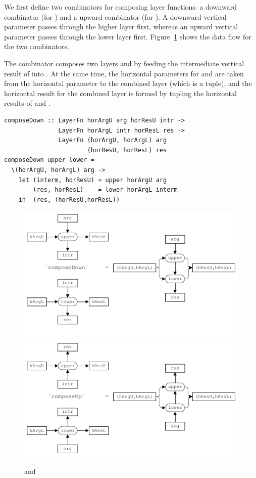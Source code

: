 \documentclass[preprint,natbib]{sigplanconf}
\begin{document}
We first define two combinators for composing layer functions: a downward combinator  (for ) and a upward combinator  (for ). A downward vertical parameter passes through the higher layer first, whereas an upward vertical parameter passes through the lower layer first. Figure~\ref{composeDownUp} shows the data flow for the two combinators. 

The combinator  composes two layers  and  by feeding the intermediate vertical result of  into . At the same time, the horizontal parameters for  and  are taken from the horizontal parameter to the combined layer (which is a tuple), and the horizontal result for the combined layer is formed by tupling the horizontal results of  and . 

\begin{small}
\begin{verbatim}
composeDown :: LayerFn horArgU arg horResU intr ->
               LayerFn horArgL intr horResL res ->
               LayerFn (horArgU, horArgL) arg 
                       (horResU, horResL) res
composeDown upper lower = 
  \(horArgU, horArgL) arg ->                                           
    let (interm, horResU) = upper horArgU arg
        (res, horResL)    = lower horArgL interm            
    in  (res, (horResU,horResL))
\end{verbatim}
\end{small}

\begin{figure}
\includegraphics[width=\columnwidth]{images/ComposeDown}
\includegraphics[width=\columnwidth]{images/ComposeUp}
\caption{ and } \label{composeDownUp} 
\end{figure}
\end{document}
